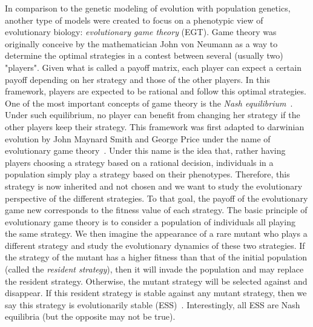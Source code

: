    In comparison to the genetic modeling of evolution with population genetics, another type of models were created to focus on a phenotypic view of evolutionary biology: \emph{evolutionary game theory} (EGT). Game theory was originally conceive by the mathematician John von Neumann as a way to determine the optimal strategies in a contest between several (usually two) "players". Given what is called a payoff matrix, each player can expect a certain payoff depending on her strategy and those of the other players. In this framework, players are expected to be rational and follow this optimal strategies. One of the most important concepts of game theory is the \emph{Nash equilibrium}~\cite{Nash1950}. Under such equilibrium, no player can benefit from changing her strategy if the other players keep their strategy. This framework was first adapted to darwinian evolution by John Maynard Smith and George Price under the name of evolutionary game theory~\cite{MaynardSmith1973}. Under this name is the idea that, rather having players choosing a strategy based on a rational decision, individuals in a population simply play a strategy based on their phenotypes. Therefore, this strategy is now inherited and not chosen and we want to study the evolutionary perspective of the different strategies. To that goal, the payoff of the evolutionary game new corresponds to the fitness value of each strategy. The basic principle of evolutionary game theory is to consider a population of individuals all playing the same strategy. We then imagine the appearance of a rare mutant who plays a different strategy and study the evolutionary dynamics of these two strategies. If the strategy of the mutant has a higher fitness than that of the initial population (called the \emph{resident strategy}), then it will invade the population and may replace the resident strategy. Otherwise, the mutant strategy will be selected against and disappear. If this resident strategy is stable against any mutant strategy, then we say this strategy is evolutionarily stable (ESS)~\cite{MaynardSmith1973}. Interestingly, all ESS are Nash equilibria (but the opposite may not be true).

